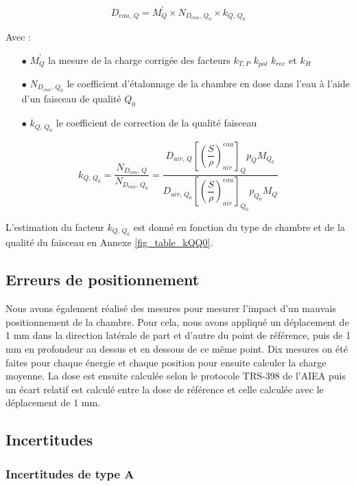 \documentclass{article}
\begin{document}
\begin{equation}
  D_{eau,\, Q} = M_{Q}^{'} \times N_{D_{eau},\, Q_0} \times k_{Q,\, Q_0}
  \label{eq_dose_398}
\end{equation}

Avec :
\begin{itemize}
  \item[$\bullet$] $M_{Q}^{'}$ la mesure de la charge corrigée des facteurs $k_{T,P}$ $k_{pol}$ $k_{rec}$ et $k_H$
  \item[$\bullet$] $N_{D_{eau},\, Q_0}$ le coefficient d'étalonnage de la chambre en dose dans l'eau à l'aide d'un faisceau de qualité $Q_0$ 
  \item[$\bullet$] $k_{Q,\, Q_0}$ le coefficient de correction de la qualité faisceau
\end{itemize}

\begin{equation}
  k_{Q,\, Q_0} = \dfrac{N_{D_{eau},\, Q}}{N_{D_{eau},\, Q_0}} = \dfrac{D_{air,\, Q} \left[\left(\dfrac{S}{\rho}\right) ^{eau}_{air}\right]_Q p_Q M_{Q_0}}{D_{air,\, Q_0 } \left[\left(\dfrac{S}{\rho}\right) ^{eau}_{air}\right]_{Q_0} p_{Q_0} M_Q}
\end{equation}

L'estimation du facteur $k_{Q,\, Q_0}$ est donné en fonction du type de chambre et de la qualité du faisceau en Annexe \ref*{fig_table_kQQ0}.

\newpage
\subsection{Erreurs de positionnement}

Nous avons également réalisé des mesures pour mesurer l'impact d'un mauvais positionnement de la chambre. Pour cela, nous avons appliqué un déplacement de 1 mm dans la direction latérale de part et d'autre du point de référence, puis de 1 mm en profondeur au dessus et en dessous de ce même point. Dix mesures on été faites pour chaque énergie et chaque position pour ensuite calculer la charge moyenne. La dose est ensuite calculée selon le protocole TRS-398 de l'AIEA \cite{international2001iaea} puis un écart relatif est calculé entre la dose de référence et celle calculée avec le déplacement de 1 mm.

\subsection{Incertitudes}

\subsubsection{Incertitudes de type A}
\end{document}
